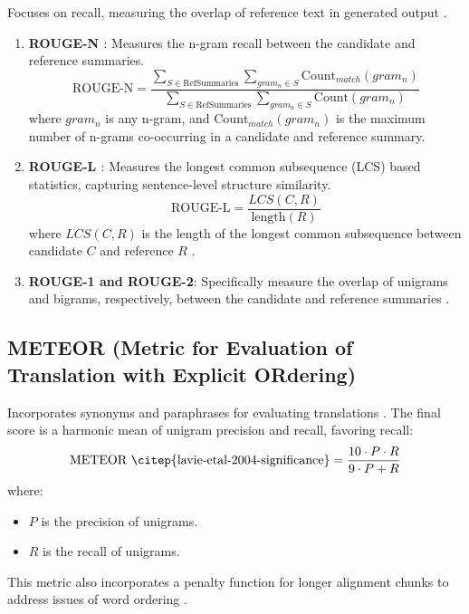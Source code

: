 Focuses on recall, measuring the overlap of reference text in generated output \citep{Ng2015Better}.

\begin{enumerate}
    \item \textbf{ROUGE-N \citep{Maples2017TheR}}: Measures the n-gram recall between the candidate and reference summaries.
    \[
    \text{ROUGE-N} = \frac{\sum_{S \in \text{RefSummaries}} \sum_{gram_n \in S} \text{Count}_{match}(gram_n)}{\sum_{S \in \text{RefSummaries}} \sum_{gram_n \in S} \text{Count}(gram_n)}
    \]
    where \( gram_n \) is any n-gram, and \( \text{Count}_{match}(gram_n) \) is the maximum number of n-grams co-occurring in a candidate and reference summary.

    \item \textbf{ROUGE-L \citep{lin-2004-rouge}}: Measures the longest common subsequence (LCS) based statistics, capturing sentence-level structure similarity.
    \[
    \text{ROUGE-L} = \frac{LCS(C, R)}{\text{length}(R)}
    \]
    where \( LCS(C, R) \) is the length of the longest common subsequence between candidate \( C \) and reference \( R \) \citep{Ng2015Better}.

    \item \textbf{ROUGE-1 and ROUGE-2}: Specifically measure the overlap of unigrams and bigrams, respectively, between the candidate and reference summaries \citep{Ganesan2015ROUGE}.
\end{enumerate}

\subsection{METEOR (Metric for Evaluation of Translation with Explicit ORdering)}

Incorporates synonyms and paraphrases for evaluating translations \citep{Agarwal2008Meteor}. The final score is a harmonic mean of unigram precision and recall, favoring recall:
\[
\text{METEOR \citep{lavie-etal-2004-significance}} = \frac{10 \cdot P \cdot R}{9 \cdot P + R}
\]
where:
\begin{itemize}
    \item \( P \) is the precision of unigrams.
    \item \( R \) is the recall of unigrams.
\end{itemize}

This metric also incorporates a penalty function for longer alignment chunks to address issues of word ordering \citep{Agarwal2008Meteor}.

